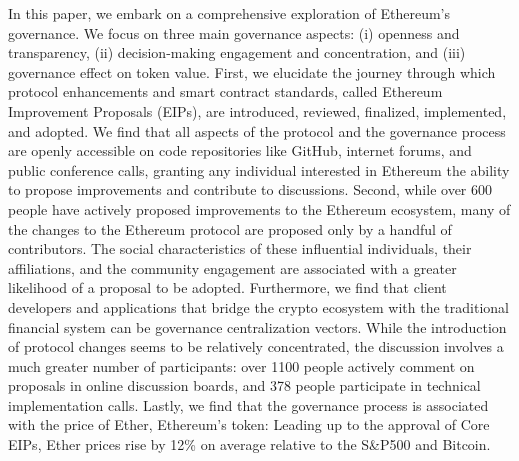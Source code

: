 \documentclass[No]{AEA}
\begin{document}
In this paper, we embark on a comprehensive exploration of Ethereum's governance. We focus on three main governance aspects: (i) openness and transparency, (ii) decision-making engagement and concentration, and (iii) governance effect on token value. First, we elucidate the journey through which protocol enhancements and smart contract standards, called Ethereum Improvement Proposals (EIPs), are introduced, reviewed, finalized, implemented, and adopted. We find that all aspects of the protocol and the governance process are openly accessible on code repositories like GitHub, internet forums, and public conference calls, granting any individual interested in Ethereum the ability to propose improvements and contribute to discussions. Second, while over 600 people have actively proposed improvements to the Ethereum ecosystem, many of the changes to the Ethereum protocol are proposed only by a handful of contributors. The social characteristics of these influential individuals, their affiliations, and the community engagement are associated with a greater likelihood of a proposal to be adopted. Furthermore, we find that client developers and applications that bridge the crypto ecosystem with the traditional financial system can be governance centralization vectors. While the introduction of protocol changes seems to be relatively concentrated, the discussion involves a much greater number of participants: over 1100 people actively comment on proposals in online discussion boards, and 378 people participate in technical implementation calls. Lastly, we find that the governance process is associated with the price of Ether, Ethereum's token: Leading up to the approval of Core EIPs, Ether prices rise by 12\% on average relative to the S\&P500 and Bitcoin. 
\end{document}

